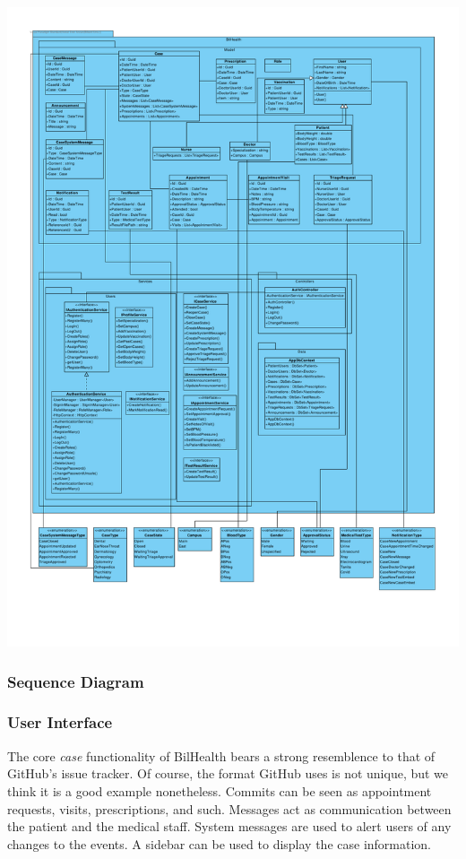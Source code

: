 \documentclass[a4paper, 12pt, titlepage]{article}
\begin{document}
  \includegraphics[width=\linewidth]{class_diag} %

  \subsubsection{Sequence Diagram}

  \subsubsection{User Interface}

  The core \textit{case} functionality of BilHealth bears a strong resemblence to that of GitHub's issue tracker.
  Of course, the format GitHub uses is not unique, but we think it is a good example nonetheless.
  Commits can be seen as appointment requests, visits, prescriptions, and such.
  Messages act as communication between the patient and the medical staff.
  System messages are used to alert users of any changes to the events.
  A sidebar can be used to display the case information.
\end{document}
